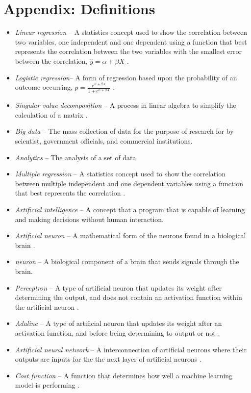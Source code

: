 \documentclass[a4paper, 12pt]{article}
\begin{document}
\newpage
\section{Appendix: Definitions}
\begin{itemize}
\item[]
\textit{Linear regression} -- A statistics concept used to show the correlation between two variables, one independent and one dependent using a function that best represents the correlation between the two variables with the smallest error between the correlation, $\hat{y}=\alpha+\beta X$ \cite{Stats2015}.
\item[]
\textit{Logistic regression}-- A form of regression based upon the probability of an outcome occurring, $p=\frac{e^{\alpha+\beta X}}{1+e^{\alpha+\beta X}}$ \cite{PrinDS}.
\item[]  
\textit{Singular value decomposition} -- A process in linear algebra to simplify the calculation of a matrix \cite{SVD}.
\item[]
\textit{Big data} -- The mass collection of  data for the purpose of research for by scientist,  government officials, and commercial institutions.
\item[]
\textit{Analytics} -- The analysis of a set of data. 
\item[]
\textit{Multiple regression} -- A statistics concept used to show the correlation between multiple independent and one dependent variables using a function that best represents the correlation \cite{Stats2015}.
\item[]
\textit{Artificial intelligence} -- A concept that a program that is capable of learning and making decisions without human interaction.
\item[]
\textit{Artificial neuron} -- A mathematical form of the neurons found in a biological brain \cite{pythonML}.
\item[]
\textit{neuron} -- A biological component of a brain that sends signals through the brain.
\item[]
\textit{Perceptron} -- A type of artificial neuron that updates its weight after determining the output, and does not contain an activation function within the artificial neuron \cite{pythonML}.
\item[]
\textit{Adaline} -- A type of artificial neuron that updates its weight after an activation function, and before being determining to output or not \cite{pythonML}.
\item[]
\textit{Artificial neural network} -- A interconnection of artificial neurons where their outputs are inputs for the the next layer of artificial neurons \cite{pythonML}.
\item[]
\textit{Cost function} -- A function that  determines how well a machine learning model is performing \cite{Cost}.

\end{itemize}
\end{document}
